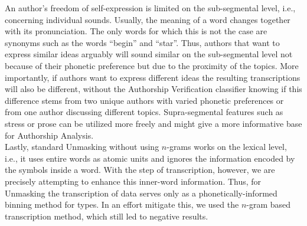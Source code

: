 An author's freedom of self-expression is limited on the sub-segmental level, i.e., concerning individual sounds.
Usually, the meaning of a word changes together with its pronunciation.
The only words for which this is not the case are synonyms such as the words ``begin'' and ``star''.
Thus, authors that want to express similar ideas arguably will sound similar on the sub-segmental level not because of their phonetic preference but due to the proximity of the topics.
More importantly, if authors want to express different ideas the resulting transcriptions will also be different, without the Authorship Verification classifier knowing if this difference stems from two unique authors with varied phonetic preferences or from one author discussing different topics.
Supra-segmental features such as stress or prose can be utilized more freely and might give a more informative base for Authorship Analysis.\\
Lastly, standard Unmasking without using $n$-grams works on the lexical level, i.e., it uses entire words as atomic units and ignores the information encoded by the symbols inside a word.
With the step of transcription, however, we are precisely attempting to enhance this inner-word information.
Thus, for Unmasking the transcription of data serves only as a phonetically-informed binning method for types.
In an effort mitigate this, we used the $n$-gram based transcription method, which still led to negative results.\\